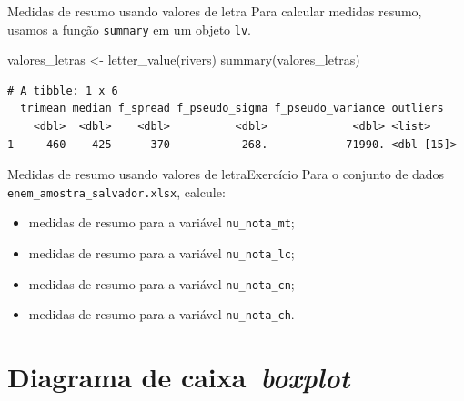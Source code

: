 \documentclass[
  10pt,
  ignorenonframetext,
]{beamer}
\newenvironment{Shaded}{\begin{snugshade}}{\end{snugshade}}
\newcommand{\FunctionTok}[1]{\textcolor[rgb]{0.28,0.35,0.67}{#1}}
\newcommand{\NormalTok}[1]{\textcolor[rgb]{0.00,0.23,0.31}{#1}}
\newcommand{\OtherTok}[1]{\textcolor[rgb]{0.00,0.23,0.31}{#1}}
\providecommand{\tightlist}{%
  \setlength{\itemsep}{0pt}\setlength{\parskip}{0pt}}\usepackage{longtable,booktabs,array}
\begin{document}
\begin{frame}[fragile]{Medidas de resumo usando valores de letra}
\protect\hypertarget{medidas-de-resumo-usando-valores-de-letra-1}{}
Para calcular medidas resumo, usamos a função \texttt{summary} em um
objeto \texttt{lv}.

\small

\begin{Shaded}
\begin{Highlighting}[]
\NormalTok{valores\_letras }\OtherTok{\textless{}{-}} \FunctionTok{letter\_value}\NormalTok{(rivers)}
\FunctionTok{summary}\NormalTok{(valores\_letras)}
\end{Highlighting}
\end{Shaded}

\begin{verbatim}
# A tibble: 1 x 6
  trimean median f_spread f_pseudo_sigma f_pseudo_variance outliers  
    <dbl>  <dbl>    <dbl>          <dbl>             <dbl> <list>    
1     460    425      370           268.            71990. <dbl [15]>
\end{verbatim}

\normalsize
\end{frame}

\begin{frame}[fragile]{Medidas de resumo usando valores de
letra\newline Exercício}
\protect\hypertarget{medidas-de-resumo-usando-valores-de-letraexercuxedcio}{}
Para o conjunto de dados \texttt{enem\_amostra\_salvador.xlsx}, calcule:

\begin{itemize}
\tightlist
\item
  medidas de resumo para a variável \texttt{nu\_nota\_mt};
\item
  medidas de resumo para a variável \texttt{nu\_nota\_lc};
\item
  medidas de resumo para a variável \texttt{nu\_nota\_cn};
\item
  medidas de resumo para a variável \texttt{nu\_nota\_ch}.
\end{itemize}
\end{frame}

\hypertarget{diagrama-de-caixa-boxplot}{%
\section{\texorpdfstring{Diagrama de
caixa\newline\newline~\emph{boxplot}}{Diagrama de caixa~boxplot}}\label{diagrama-de-caixa-boxplot}}
\end{document}

